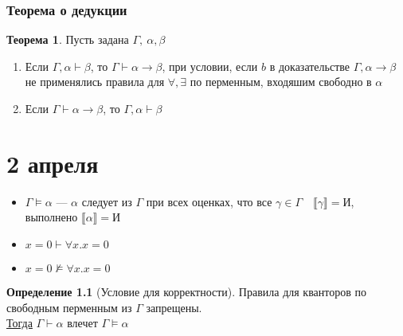 \documentclass[oneside]{book}
\theoremstyle{plain}
\theoremstyle{remark}
\theoremstyle{definition}
\newtheorem{theorem}{Теорема}[section]
\newtheorem*{definition}{Определение}
\begin{document}
\subsection{Теорема о дедукции}
\label{sec:orge289dd1}
\begin{theorem}
Пусть задана \(\Gamma,\ \alpha,\beta\)
\begin{enumerate}
\item Если \(\Gamma, \alpha \vdash \beta\), то \(\Gamma \vdash \alpha \to \beta\), при условии, если \(b\) в доказательстве \(\Gamma, \alpha \to \beta\) не применялись правила для \(\forall, \exists\) по перменным, входяшим свободно в \(\alpha\)
\item Если \(\Gamma \vdash \alpha \to \beta\), то \(\Gamma, \alpha \vdash \beta\)
\end{enumerate}
\label{org8debde0}
\end{theorem}
\chapter{2 апреля}
\label{sec:orgdbb07f7}
\begin{itemize}
\item \(\Gamma \vDash \alpha\) --- \(\alpha\) следует из \(\Gamma\) при всех оценках, что все \(\gamma \in \Gamma\quad \llbracket \gamma \rrbracket = \text{И}\), выполнено \(\llbracket \alpha \rrbracket = \text{И}\)
\item \(x = 0 \vdash \forall x. x = 0\)
\item \(x = 0 \not\vDash \forall x. x = 0\)
\end{itemize}
\begin{definition}[Условие для корректности]
Правила для кванторов по свободным перменным из \(\Gamma\) запрещены. \\
\uline{Тогда} \(\Gamma \vdash \alpha\) влечет \(\Gamma \vDash \alpha\)
\end{definition}
\end{document}
